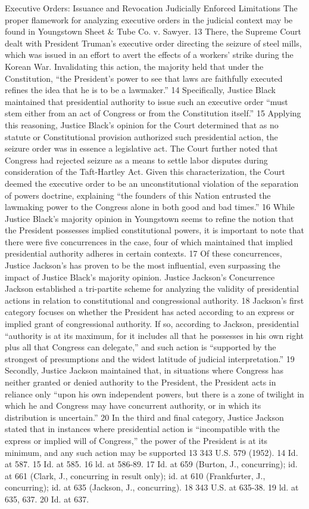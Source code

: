 \documentclass[11pt,a4paper]{article}
\begin{document}
Executive Orders: Issuance and Revocation Judicially Enforced Limitations The proper flamework for analyzing executive orders in the judicial context may be found in Youngstown Sheet \& Tube Co. v. Sawyer. 13 There, the Supreme Court dealt with President Truman's executive order directing the seizure of steel mills, which was issued in an effort to avert the effects of a workers' strike during the Korean War. Invalidating this action, the majority held that under the Constitution, “the President's power to see that laws are faithfully executed refines the idea that he is to be a lawmaker.” 14 Specifically, Justice Black maintained that presidential authority to issue such an executive order “must stem either from an act of Congress or from the Constitution itself.” 15 Applying this reasoning, Justice Black's opinion for the Court determined that as no statute or Constitutional provision authorized such presidential action, the seizure order was in essence a legislative act. The Court further noted that Congress had rejected seizure as a means to settle labor disputes during consideration of the Taft-Hartley Act. Given this characterization, the Court deemed the executive order to be an unconstitutional violation of the separation of powers doctrine, explaining “the founders of this Nation entrusted the lawmaking power to the Congress alone in both good and bad times.” 16 While Justice Black's majority opinion in Youngstown seems to refine the notion that the President possesses implied constitutional powers, it is important to note that there were five concurrences in the case, four of which maintained that implied presidential authority adheres in certain contexts. 17 Of these concurrences, Justice Jackson's has proven to be the most influential, even surpassing the impact of Justice Black's majority opinion. Justice Jackson's Concurrence Jackson established a tri-partite scheme for analyzing the validity of presidential actions in relation to constitutional and congressional authority. 18 Jackson's first category focuses on whether the President has acted according to an express or implied grant of congressional authority. If so, according to Jackson, presidential “authority is at its maximum, for it includes all that he possesses in his own right plus all that Congress can delegate,” and such action is “supported by the strongest of presumptions and the widest latitude of judicial interpretation.” 19 Secondly, Justice Jackson maintained that, in situations where Congress has neither granted or denied authority to the President, the President acts in reliance only “upon his own independent powers, but there is a zone of twilight in which he and Congress may have concurrent authority, or in which its distribution is uncertain.” 20 In the third and final category, Justice Jackson stated that in instances where presidential action is “incompatible with the express or implied will of Congress,” the power of the President is at its minimum, and any such action may be supported 13 343 U.S. 579 (1952). 14 Id. at 587. 15 Id. at 585. 16 ld. at 586-89. 17 Id. at 659 (Burton, J., concurring); id. at 661 (Clark, J., concurring in result only); id. at 610 (Frankfurter, J., concurring); id. at 635 (Jackson, J., concurring). 18 343 U.S. at 635-38. 19 ld. at 635, 637. 20 Id. at 637. 
\end{document}
